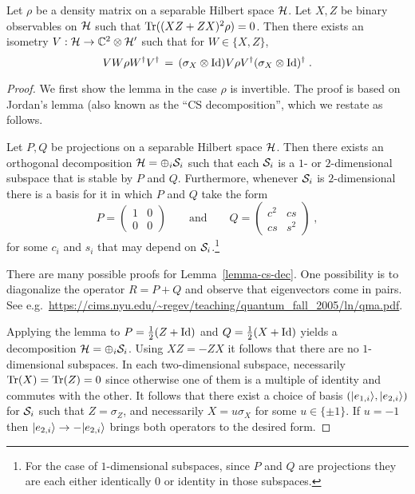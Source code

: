 \begin{lemma}\label{lemma-ac-exact}
Let $\rho$ be a density matrix on a separable Hilbert space $\mathcal{H}$. Let $X,Z$ be binary observables on $\mathcal{H}$ such that $\mathrm{Tr}( (XZ+ZX)^2 \rho)=0$. Then there exists an isometry $V: \mathcal{H} \to \mathbb{C}^2 \otimes \mathcal{H}'$ such that for $W\in\{X,Z\}$,
\[ VW\rho W^\dagger V^\dagger \,=\, (\sigma_X \otimes \mathop{\rm Id}\nolimits)V\rho V^\dagger (\sigma_X \otimes \mathop{\rm Id}\nolimits)^\dagger\;.\]
\end{lemma}

\begin{proof}
We first show the lemma in the case $\rho$ is invertible. The proof is based on Jordan's lemma (also known as the ``CS decomposition'', which we restate as follows. 


\begin{lemma}\label{lemma-cs-dec}
Let $P,Q$ be projections on a separable Hilbert space $\mathcal{H}$. Then there exists an orthogonal decomposition $\mathcal{H} = \oplus_i \mathcal{S}_i$ such that each $\mathcal{S}_i$ is a $1$- or $2$-dimensional subspace that is stable by $P$ and $Q$. Furthermore, whenever $\mathcal{S}_i$ is $2$-dimensional there is a basis for it in which $P$ and $Q$ take the form
\begin{equation}\label{eq:pq-form}
 P = \begin{pmatrix} 1 & 0 \\ 0 & 0 \end{pmatrix} \qquad \text{and} \qquad Q = \begin{pmatrix} c^2 & cs \\ cs & s^2 \end{pmatrix}\;,
\end{equation}
 for some $c_i$ and $s_i$ that may depend on $\mathcal{S}_i$.\footnote{For the case of $1$-dimensional subspaces, since $P$ and $Q$ are projections they are each either identically $0$ or identity in those subspaces.}
\end{lemma} 

There are many possible proofs for Lemma~\ref{lemma-cs-dec}. One possibility is to diagonalize the operator $R=P+Q$ and observe that eigenvectors come in pairs. See e.g.~\url{https://cims.nyu.edu/~regev/teaching/quantum_fall_2005/ln/qma.pdf}. 

Applying the lemma to $P = \frac{1}{2}(Z+\mathop{\rm Id}\nolimits)$ and $Q = \frac{1}{2}(X+\mathop{\rm Id}\nolimits)$ yields a decomposition $\mathcal{H} = \oplus_i \mathcal{S}_i$. Using $XZ=-ZX$ it follows that there are no $1$-dimensional subspaces. In each two-dimensional subspace, necessarily $\mathrm{Tr}(X)=\mathrm{Tr}(Z)=0$ since otherwise one of them is a multiple of identity and commutes with the other. It follows that there exist a choice of basis $(|e_{1,i}\rangle,|e_{2,i}\rangle)$ for $\mathcal{S}_i$ such that $Z = \sigma_Z$, and necessarily $X = u \sigma_X$ for some $u\in \{\pm 1\}$. If $u=-1$ then $|e_{2,i}\rangle \to - |e_{2,i}\rangle$ brings both operators to the desired form. 


\end{proof}
